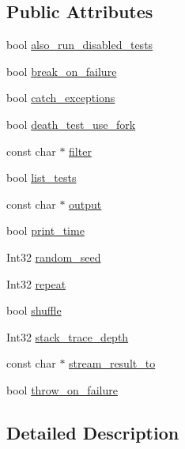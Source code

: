 \subsection*{Public Attributes}
\begin{DoxyCompactItemize}
\item 
bool \hyperlink{structtesting_1_1_flags_a8ebf8c68f918b9039926b569c880f910}{also\+\_\+run\+\_\+disabled\+\_\+tests}
\item 
bool \hyperlink{structtesting_1_1_flags_acccce2a9673bb61751269d2ef9c21c89}{break\+\_\+on\+\_\+failure}
\item 
bool \hyperlink{structtesting_1_1_flags_a06984d0553f09716e1bd9f159e7cc644}{catch\+\_\+exceptions}
\item 
bool \hyperlink{structtesting_1_1_flags_a7cdef4e6e102771fc15940931dd07e5c}{death\+\_\+test\+\_\+use\+\_\+fork}
\item 
const char $\ast$ \hyperlink{structtesting_1_1_flags_aa52c1048a7e3cbe726ed4160f2e05d14}{filter}
\item 
bool \hyperlink{structtesting_1_1_flags_a3c73f29131074146224018066379fb2f}{list\+\_\+tests}
\item 
const char $\ast$ \hyperlink{structtesting_1_1_flags_a8c8289b3af9310744bc25280e3980e4b}{output}
\item 
bool \hyperlink{structtesting_1_1_flags_a8758d574ce5513402679df258f788733}{print\+\_\+time}
\item 
Int32 \hyperlink{structtesting_1_1_flags_a4728bce63433f711205fd7b427e57f1b}{random\+\_\+seed}
\item 
Int32 \hyperlink{structtesting_1_1_flags_a61614dd07f97f6e04d27c004ff15195e}{repeat}
\item 
bool \hyperlink{structtesting_1_1_flags_a51c689e47e0f55c16116ac2a1d3b05d6}{shuffle}
\item 
Int32 \hyperlink{structtesting_1_1_flags_a20c6592453909c1adace64bf6a2bc2de}{stack\+\_\+trace\+\_\+depth}
\item 
const char $\ast$ \hyperlink{structtesting_1_1_flags_ab09849fd3e095d5628dec65ec4dce9e1}{stream\+\_\+result\+\_\+to}
\item 
bool \hyperlink{structtesting_1_1_flags_ab8e7d21e31e641efe47b8050759e001a}{throw\+\_\+on\+\_\+failure}
\end{DoxyCompactItemize}


\subsection{Detailed Description}


